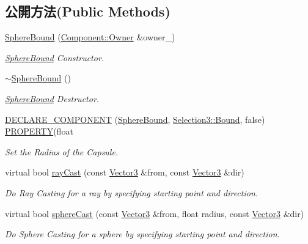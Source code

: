 \subsection*{公開方法(Public Methods)}
\begin{DoxyCompactItemize}
\item 
\hyperlink{class_magnum_1_1_sphere_bound_ad0985e38af18aef4548764c8ac834d97}{Sphere\+Bound} (\hyperlink{class_magnum_1_1_component_1_1_owner}{Component\+::\+Owner} \&owner\+\_\+)
\begin{DoxyCompactList}\small\item\em \hyperlink{class_magnum_1_1_sphere_bound}{Sphere\+Bound} Constructor. \end{DoxyCompactList}\item 
\hyperlink{class_magnum_1_1_sphere_bound_a6945c94afcf7753b176a3633fb73d58f}{$\sim$\+Sphere\+Bound} ()
\begin{DoxyCompactList}\small\item\em \hyperlink{class_magnum_1_1_sphere_bound}{Sphere\+Bound} Destructor. \end{DoxyCompactList}\item 
\hyperlink{class_magnum_1_1_sphere_bound_ad7d7f34a4f8fcb1b3943fd392c6401e4}{D\+E\+C\+L\+A\+R\+E\+\_\+\+C\+O\+M\+P\+O\+N\+E\+NT} (\hyperlink{class_magnum_1_1_sphere_bound}{Sphere\+Bound}, \hyperlink{class_magnum_1_1_selection3_1_1_bound}{Selection3\+::\+Bound}, false)   \hyperlink{class_magnum_1_1_component_a30a9f5cf6e5c94519c752f30ac3c6013}{P\+R\+O\+P\+E\+R\+TY}(float
\begin{DoxyCompactList}\small\item\em Set the Radius of the Capsule. \end{DoxyCompactList}\item 
virtual bool \hyperlink{class_magnum_1_1_sphere_bound_a0678ac647bb7374a3759000a1619bf45}{ray\+Cast} (const \hyperlink{class_magnum_1_1_vector3}{Vector3} \&from, const \hyperlink{class_magnum_1_1_vector3}{Vector3} \&dir)
\begin{DoxyCompactList}\small\item\em Do Ray Casting for a ray by specifying starting point and direction. \end{DoxyCompactList}\item 
virtual bool \hyperlink{class_magnum_1_1_sphere_bound_a3f4ad2ea0a478b6ec6aaf7f79f21899a}{sphere\+Cast} (const \hyperlink{class_magnum_1_1_vector3}{Vector3} \&from, float radius, const \hyperlink{class_magnum_1_1_vector3}{Vector3} \&dir)
\begin{DoxyCompactList}\small\item\em Do Sphere Casting for a sphere by specifying starting point and direction. \end{DoxyCompactList}\end{DoxyCompactItemize}
